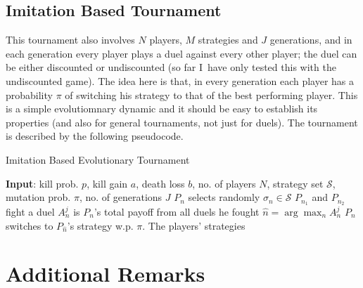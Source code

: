 \documentclass{article}%
\numberwithin{equation}{section}
\begin{document}
\subsection{Imitation Based Tournament}

This tournament also involves $N$ players, $M$ strategies and $J$ generations,
and in each generation every player plays a duel against every other player;
the duel can be either discounted or undiscounted (so far I\ have only tested
this with the undiscounted game). The idea here is that, in every generation
each player has a probability $\pi$ of switching his strategy to that of the
best performing player. This is a simple evolutiomnary dynamic and it should
be easy to establish its properties (and also for general tournaments, not
just for duels). The tournament is described by the following pseudocode.

\begin{algorithm}[h!]
\caption{Imitation Based Evolutionary Tournament}\label{LrngAlg01}
\begin{algorithmic}[1]
\State \textbf{Input}: kill prob. $p$, kill gain $a$, death loss $b$, no. of players $N$,
strategy set $\mathcal{S}$, mutation prob. $\pi$, no. of generations $J$
\State $P_n$ selects randomly $\sigma_n\in\mathcal{S}$
\EndFor
{}
\State $P_{n_1}$ and $P_{n_2}$ fight a duel
\EndFor
\EndFor
{}
\State $A^j_n$ is $P_n$'s total payoff from all duels he fought
\EndFor
\State $\widehat{n}=\arg\max_n A^j_n$
\State $P_n$ switches to $P_{\widehat{n}}$'s strategy w.p. $\pi$.
\EndFor
\State \Return The players' strategies
\end{algorithmic}
\end{algorithm}


\bigskip

\newpage

\section{Additional Remarks}
\end{document}
